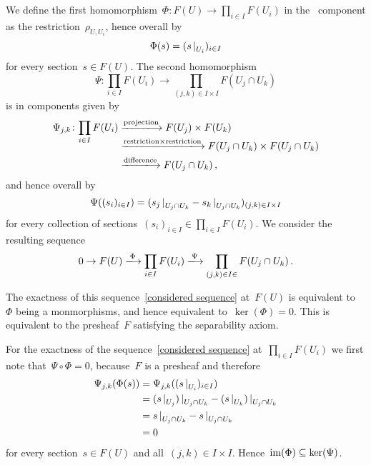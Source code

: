 \section{}

We define the first homomorphism~$\Phi \colon F(U) \to \prod_{i \in I} F(U_i)$ in the~ component as the restriction~$\rho_{U, U_i}$, hence overall by
\[
    \Phi( s )
  = ( \restrict{s}{U_i} )_{i \in I}
\]
for every section~$s \in F(U)$.
The second homomorphism
\[
          \Psi
  \colon  \prod_{i \in I} F(U_i)
  \to     \prod_{(j,k) \in I \times I} F(U_j \cap U_k)
\]
is in components given by
\begin{align*}
  \Psi_{j,k}
  \colon
  \smash{\prod_{i \in I} F(U_i)}
  &\xlongto{\text{projection}}
  F(U_j) \times F(U_k)  \\
  &\xlongto{\text{restriction} \times \text{restriction}}
  F(U_j \cap U_k) \times F(U_j \cap U_k)  \\
  &\xlongto{\text{difference}}
  F(U_j \cap U_k) \,,
\end{align*}
and hence overall by
\[
    \Psi( (s_i)_{i \in I} )
  = ( \restrict{s_j}{U_j \cap U_k} - \restrict{s_k}{U_j \cap U_k} )_{(j,k) \in I \times I}
\]
for every collection of sections~$(s_i)_{i \in I} \in \prod_{i \in I} F(U_i)$.
We consider the resulting sequence
\begin{equation}
  \label{considered sequence}
  0
  \to
  F(U)
  \xlongto{\Phi}
  \prod_{i \in I} F(U_i)
  \xlongto{\Psi}
  \prod_{(j,k) \in I \in } F(U_j \cap U_k) \,.
\end{equation}

The exactness of this sequence~\eqref{considered sequence} at~$F(U)$ is equivalent to~$\Phi$ being a monmorphisms, and hence equivalent to~$\ker(\Phi) = 0$.
This is equivalent to the presheaf~$F$ satisfying the separability axiom.

For the exactness of the sequence~\eqref{considered sequence} at~$\prod_{i \in I} F(U_i)$ we first note that~$\Psi \circ \Phi = 0$, because~$F$ is a presheaf and therefore
\begin{align*}
      \Psi_{j,k}( \Phi(s) )
  &=  \Psi_{j,k}( ( \restrict{s}{U_i} )_{i \in I} ) \\
  &=  \restrict{(\restrict{s}{U_j})}{U_j \cap U_k} - \restrict{(\restrict{s}{U_k})}{U_j \cap U_k} \\
  &=  \restrict{s}{U_j \cap U_k} - \restrict{s}{U_j \cap U_k} \\
  &=  0
\end{align*}
for every section~$s \in F(U)$ and all~$(j,k) \in I \times I$.
Hence~$\operatorname{im}(\Phi) \subseteq \ker(\Psi)$.

